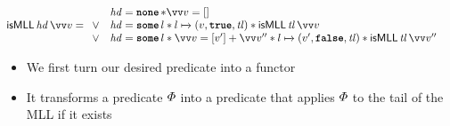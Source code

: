 \documentclass[thesis.tex]{subfiles}
\begin{document}
\begin{align*}
  \textlog{isMLL}\, \langv{hd}\, \vect{\val} & =
  \begin{array}{cl}
         & \langv{hd} = \None * \vect{\val} = []                                                                                                                \\
    \lor & \langv{hd} = \Some l * l \fmapsto (\val, \True, \langv{tl}) * \textlog{isMLL}\, \langv{tl}\, \vect{\val}                                             \\
    \lor & \langv{hd} = \Some l * \vect{\val} = [\val'] + \vect{\val}'' * l \fmapsto (\val', \False, \langv{tl}) * \textlog{isMLL}\, \langv{tl}\, \vect{\val}''
  \end{array}
\end{align*}
\begin{itemize}
  \item We first turn our desired predicate into a functor
  \item It transforms a predicate $\varPhi$ into a predicate that applies $\varPhi$ to the tail of the MLL if it exists 
\end{itemize}
\end{document}
